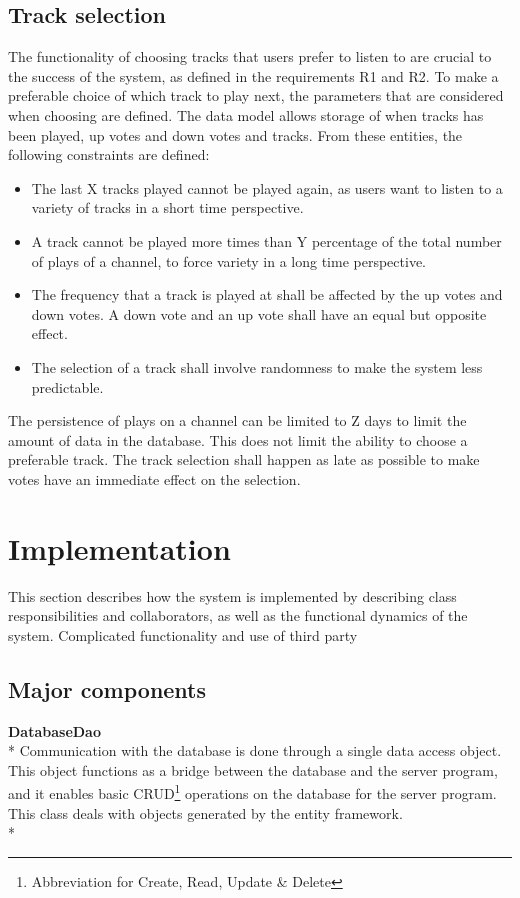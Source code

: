 \documentclass[a4paper,11pt,report]{article}
\begin{document}
\subsection{Track selection}
The functionality of choosing tracks that users prefer to listen to are crucial to the success of the system, as defined in the requirements R1 and R2. To make a preferable choice of which track to play next, the parameters that are considered when choosing are defined. The data model allows storage of when tracks has been played, up votes and down votes and tracks. From these entities, the following constraints are defined:
\begin{itemize}
\item The last X tracks played cannot be played again, as users want to listen to a variety of tracks in a short time perspective.
\item A track cannot be played more times than Y percentage of the total number of plays of a channel, to force variety in a long time perspective.
\item The frequency that a track is played at shall be affected by the up votes and down votes. A down vote and an up vote shall have an equal but opposite effect.
\item The selection of a track shall involve randomness to make the system less predictable.
\end{itemize}
The persistence of plays on a channel can be limited to Z days to limit the amount of data in the database. This does not limit the ability to choose a preferable track. The track selection shall happen as late as possible to make votes have an immediate effect on the selection. 

\section{Implementation}
This section describes how the system is implemented by describing class responsibilities and collaborators, as well as the functional dynamics of the system. Complicated functionality and use of third party 

\subsection{Major components}
\textbf{DatabaseDao} \\*
Communication with the database is done through a single data access object. This object functions as a bridge between the database and the server program, and it enables basic CRUD\footnote{Abbreviation for Create, Read, Update \& Delete} operations on the database for the server program. This class deals with objects generated by the entity framework. \\*
\end{document}
